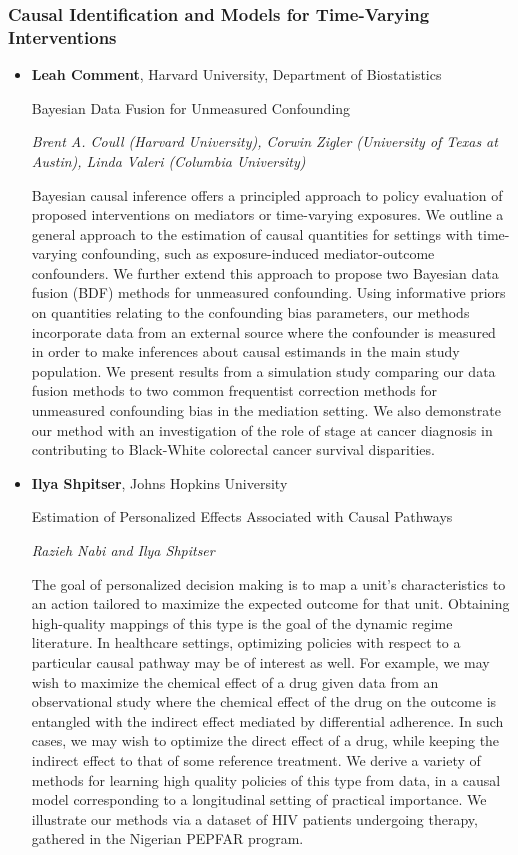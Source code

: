 \subsubsection*{Causal Identification and Models for Time-Varying Interventions}

\begin{itemize}
\item \textbf{Leah Comment}, Harvard University, Department of Biostatistics

Bayesian Data Fusion for Unmeasured Confounding

\emph{\footnotesize Brent A. Coull (Harvard University), Corwin Zigler (University of Texas at Austin), Linda Valeri (Columbia University)}

Bayesian causal inference offers a principled approach to policy evaluation of proposed interventions on mediators or time-varying exposures. We outline a general approach to the estimation of causal quantities for settings with time-varying confounding, such as exposure-induced mediator-outcome confounders. We further extend this approach to propose two Bayesian data fusion (BDF) methods for unmeasured confounding. Using informative priors on quantities relating to the confounding bias parameters, our methods incorporate data from an external source where the confounder is measured in order to make inferences about causal estimands in the main study population. We present results from a simulation study comparing our data fusion methods to two common frequentist correction methods for unmeasured confounding bias in the mediation setting. We also demonstrate our method with an investigation of the role of stage at cancer diagnosis in contributing to Black-White colorectal cancer survival disparities.

\item \textbf{Ilya Shpitser}, Johns Hopkins University

Estimation of Personalized Effects Associated with Causal Pathways

\emph{\footnotesize Razieh Nabi and Ilya Shpitser}

The goal of personalized decision making is to map a unit’s characteristics to an action tailored to maximize the expected outcome for that unit. Obtaining high-quality mappings of this type is the goal of the dynamic regime literature. In healthcare settings, optimizing policies with respect to a particular causal pathway may be of interest as well. For example, we may wish to maximize the chemical effect of a drug given data from an observational study where the chemical effect of the drug on the outcome is entangled with the indirect effect mediated by differential adherence. In such cases, we may wish to optimize the direct effect of a drug, while keeping the indirect effect to that of some reference treatment. We derive a variety of methods for learning high quality policies of this type from data, in a causal model corresponding to a longitudinal setting of practical importance. We illustrate our methods via a dataset of HIV patients undergoing therapy, gathered in the Nigerian PEPFAR program.



\end{itemize}
